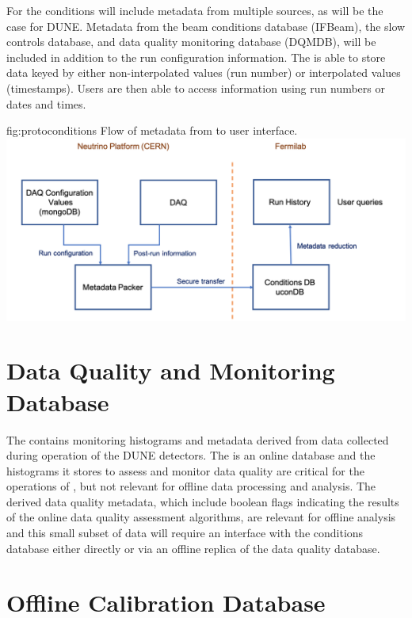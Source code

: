 \documentclass[../main-v1.tex]{subfiles}
\begin{document}
For %
 the conditions  will include metadata from multiple sources, as will be the case for DUNE. Metadata from the beam conditions database (IFBeam), the slow controls database, and data quality monitoring database (DQMDB), will be included in addition to the run configuration information. The  is able to store data keyed by either non-interpolated values (run number) or interpolated values (timestamps). Users are then able to access information using run numbers or dates and times.

\begin{dunefigure}
{fig:protoconditions} 
{Flow of metadata from   to user interface.}
\includegraphics[width=.9\columnwidth]{graphics/Databases/Conditions_ProtoDUNE.png}
\end{dunefigure}

\section{Data Quality and Monitoring Database  }
\label{sec:db:dqm}  

The  contains monitoring histograms and metadata derived from data collected during operation of the DUNE detectors. The   is an online database and
the histograms it stores to assess and monitor data quality are critical for the operations of , but not relevant for offline data processing and analysis.
The derived data quality metadata, which include boolean flags indicating the results of the online data quality assessment algorithms, are relevant for offline analysis and this small subset of  data will require an interface with the conditions database either directly or via an offline replica of the data quality database. 

\section{Offline Calibration Database  }
\label{sec:db:calib} 
\end{document}
